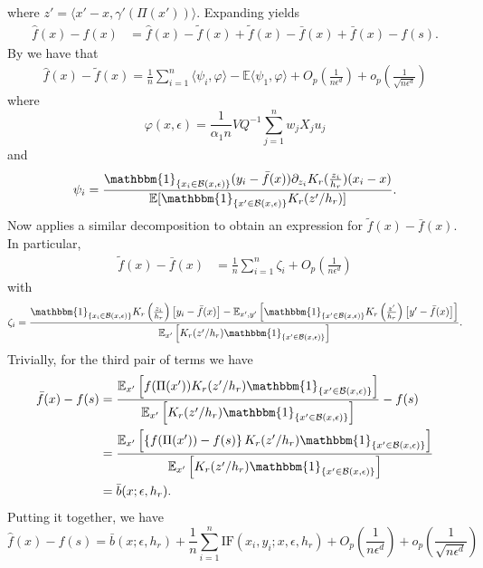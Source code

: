 \documentclass[11pt]{article}
\begin{document}
where $z' = \langle x'-x,\gamma'(\Pi(x'))\rangle$. Expanding yields
\begin{align}
    \hat{f}(x) - f(x) &= \hat{f}(x) - \tilde{f}(x) + 
    \tilde{f}(x) - \bar{f}(x) + \bar{f}(x) - f(s).
\end{align}
By  we have that
\begin{align}
\hat{f}(x) - \tilde{f}(x) = \frac{1}{n}\sum_{i = 1}^n\langle\psi_i, \varphi\rangle - \mathbb{E}\langle\psi_1, \varphi\rangle + O_p\left(\frac{1}{n\epsilon^{d}}\right) + o_p\left(\frac{1}{\sqrt{n\epsilon^d}}\right)
\end{align}
where 
\[\varphi(x, \epsilon) = \frac{1}{\alpha_1n}VQ^{-1}\sum_{j = 1}^nw_jX_ju_j\]
and
\[\psi_i = \frac{\mathbbm{1}_{\{x_i \in \mathcal{B}(x, \epsilon)\}}(y_i - \bar{f}(x))\partial_{z_i}K_r(\frac{z_i}{h_r})(x_i - x)}{\mathbb{E}[\mathbbm{1}_{\{x' \in \mathcal{B}(x, \epsilon)\}}K_r(z'/h_r)]}.\]
Now  applies a similar decomposition to obtain an expression for $\tilde{f}(x) - \bar{f}(x)$. In particular,
\begin{align}
    \tilde{f}(x) - \bar{f}(x) &= \frac{1}{n}\sum_{i = 1}^n\zeta_i + O_p\left(\frac{1}{n\epsilon^{d}}\right) 
\end{align}
with 
\begin{equation}
    \zeta_i = \frac{\mathbbm{1}_{\{x_i \in \mathcal{B}(x, \epsilon)\}}K_r\left(\frac{z_i}{h_r}\right)\left[y_i - \bar{f}(x)\right] - \mathbb{E}_{x', y'}\left[\mathbbm{1}_{\{x' \in \mathcal{B}(x, \epsilon)\}}K_r\left(\frac{z'}{h_r}\right)\left[y' - \bar{f}(x)\right]\right]}{\mathbb{E}_{x'}\left[K_r(z'/h_r)\mathbbm{1}_{\{x'\in \mathcal{B}(x, \epsilon)\}}\right]}.
\end{equation}
Trivially, for the third pair of terms we have
\begin{align}
    \bar{f}(x) - f(s) &= \frac{\mathbb{E}_{x'}\left[f(\Pi(x'))K_r(z'/h_r)\mathbbm{1}_{\{x'\in \mathcal{B}(x, \epsilon)\}}\right]}{\mathbb{E}_{x'}\left[K_r(z'/h_r)\mathbbm{1}_{\{x'\in \mathcal{B}(x, \epsilon)\}}\right]} - f(s) \\
    &= \frac{\mathbb{E}_{x'}\left[\left\{f(\Pi(x')) - f(s)\right\}K_r(z'/h_r)\mathbbm{1}_{\{x'\in \mathcal{B}(x, \epsilon)\}}\right]}{\mathbb{E}_{x'}\left[K_r(z'/h_r)\mathbbm{1}_{\{x'\in \mathcal{B}(x, \epsilon)\}}\right]}\\
    &= \bar{b}(x; \epsilon, h_r).
\end{align}
Putting it together, we have 
\begin{equation}
    \hat{f}(x) - f(s) = \bar{b}(x; \epsilon, h_r) + \frac{1}{n}\sum_{i = 1}^n\text{IF}(x_i, y_i; x, \epsilon, h_r) + O_p\left(\frac{1}{n\epsilon^{d}}\right) + o_p\left(\frac{1}{\sqrt{n\epsilon^d}}\right)
\end{equation}
\end{document}
